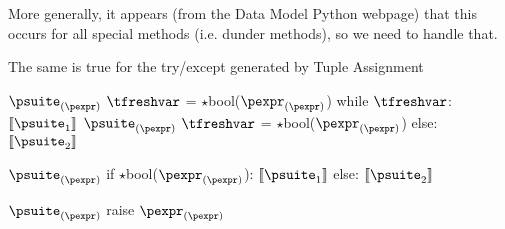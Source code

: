 \documentclass{article}
\begin{document}
More generally, it appears (from the Data Model Python webpage) that this occurs
for all special methods (i.e. dunder methods), so we need to handle that.

The same is true for the try/except generated by Tuple Assignment

\begin{mathpar}
\end{mathpar}

\newsavebox{\whileBox}
\begin{lrbox}{\whileBox}
\begin{python}
$\psuite_{(\pexpr)}$
$\tfreshvar$ = $\star$bool($\pexpr_{(\pexpr)}$)
while $\tfreshvar$:
  $\meaningof{\psuite_1}$
  $\psuite_{(\pexpr)}$
  $\tfreshvar$ = $\star$bool($\pexpr_{(\pexpr)}$)
else:
  $\meaningof{\psuite_2}$
\end{python}
\end{lrbox}

\begin{mathpar}
\end{mathpar}

\newsavebox{\ifBox}
\begin{lrbox}{\ifBox}
\begin{python}
$\psuite_{(\pexpr)}$
if $\star$bool($\pexpr_{(\pexpr)}$):
  $\meaningof{\psuite_1}$
else:
  $\meaningof{\psuite_2}$
\end{python}
\end{lrbox}

\begin{mathpar}
\end{mathpar}

\newsavebox{\raiseBox}
\begin{lrbox}{\raiseBox}
\begin{python}
$\psuite_{(\pexpr)}$
raise $\pexpr_{(\pexpr)}$
\end{python}
\end{lrbox}

\begin{mathpar}
\end{mathpar}
\end{document}

